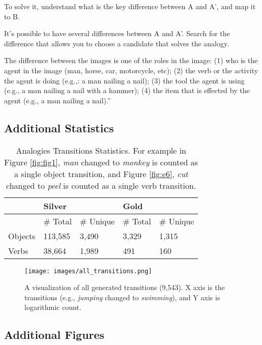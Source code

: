 \documentclass[letterpaper]{article} \usepackage{aaai23}  \usepackage{times}  \usepackage{helvet}  \usepackage{courier}  \usepackage[hyphens]{url}  \usepackage{graphicx} \urlstyle{rm} \def\UrlFont{\rm}  \usepackage{natbib}  \usepackage{caption} \frenchspacing  \setlength{\pdfpagewidth}{8.5in}  \setlength{\pdfpageheight}{11in}  \usepackage{algorithm}
\begin{document}
To solve it, understand what is the key difference between A and A', and map it to B.

It's possible to have several differences between A and A'. Search for the difference that allows you to choose a candidate that solves the analogy.

The difference between the images is one of the roles in the image:
(1) who is the agent in the image (man, horse, car, motorcycle, etc);
(2) the verb or the activity the agent is doing (e.g.,: a man nailing a nail);
(3) the tool the agent is using (e.g., a man nailing a nail with a hammer);
(4) the item that is effected by the agent (e.g., a man nailing a nail).''

\subsection{Additional Statistics} 
\label{sec:additional_stats}
\begin{table}[!h]
\begin{tabular}{@{}lllll@{}}
\toprule
        & \multicolumn{2}{l}{Silver} & \multicolumn{2}{l}{Gold} \\ \midrule
        & \# Total    & \# Unique    & \# Total   & \# Unique   \\
Objects & 113,585     & 3,490        & 3,329      & 1,315       \\
Verbs   & 38,664      & 1,989        & 491        & 160         \\ \bottomrule
\end{tabular}
\label{tab:more_stats}
\caption{Analogies Transitions Statistics. For example in Figure \ref{fig:fig1}, \emph{man} changed to \emph{monkey} is counted as a single object transition, and Figure \ref{fig:e6}, \emph{cut} changed to \emph{peel} is counted as a single verb transition.}
\end{table}

\begin{figure}[!h]
\centering
\newcommand{\figlen}[0]{\columnwidth}
    \texttt{[image: images/all\_transitions.png]}\\
    \caption{A visualization of all generated transitions (9,543). X axis is the transitions (e.g., \emph{jumping} changed to \emph{swimming}), and Y axis is logarithmic count.}
    \label{fig:transitions}
\end{figure}

\subsection{Additional Figures}
\label{sec:additional_figures}
\end{document}
